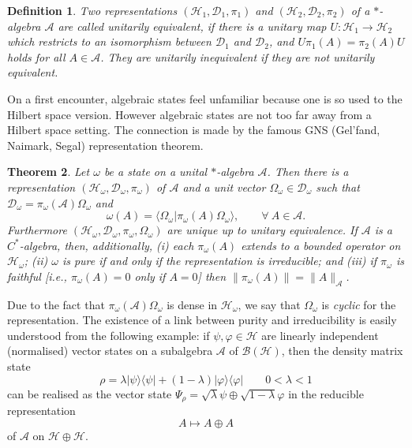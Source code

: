 \documentclass[12pt,a4paper]{article}
\newcommand{\1}{\mathds{1}}                         %
\newcommand{\BB}{{\mathcal{B}}}
\newcommand{\HH}{{\mathcal{H}}}
\newcommand{\DD}{{\mathscr{D}}}
\newcommand{\Ac}{{\mathcal{A}}}
\newcommand{\ip}[2]{\langle #1|#2\rangle}
\newcommand{\ket}[1]{|#1\rangle}
\newcommand{\bra}[1]{\langle #1|}
\newtheorem{theorem}{Theorem}%
\newtheorem{df}[theorem]{Definition}}
\begin{document}
\begin{df}
	Two representations $(\HH_1,\DD_1,\pi_1)$ and $(\HH_2,\DD_2,\pi_2)$ of a $*$-algebra $\Ac$ are called \emph{unitarily equivalent}, if
	there is a unitary map $U:\HH_1\rightarrow\HH_2$ which 
	restricts to an isomorphism between $\DD_1$ and $\DD_2$, and 
	$U\pi_1(A)=\pi_2(A) U$ holds for all $A\in\Ac$. They are \emph{unitarily inequivalent} if they are not unitarily equivalent.
\end{df} 

On a first encounter, algebraic states feel unfamiliar because one is so used to the Hilbert space version. However algebraic states are not too far away from a Hilbert space setting. The connection is made by the famous GNS (Gel'fand, Naimark, Segal) representation theorem. 
\begin{theorem}  Let $\omega$ be a state on a unital $*$-algebra $\Ac$. 
	Then there is a representation $(\HH_\omega,\DD_\omega,\pi_\omega)$
	of $\Ac$ and a unit
	vector $\Omega_\omega\in\DD_\omega$ such that $\DD_\omega=\pi_\omega(\Ac)\Omega_\omega$ and
	\begin{equation}\label{eq:GNSprop}
	\omega(A) =\ip{\Omega_\omega}{\pi_\omega(A)\Omega_\omega}, \qquad \forall~A\in \Ac.
	\end{equation}
	Furthermore $(\HH_\omega,\DD_\omega,\pi_\omega,\Omega_\omega)$ are unique up to unitary equivalence. If $\Ac$ is a $C^*$-algebra,
	then, additionally, (i) each $\pi_\omega(A)$ extends to a bounded operator on $\HH_\omega$; (ii)
	$\omega$ is pure if and only if the representation is irreducible; 
	and (iii) if $\pi_\omega$ is faithful [i.e., $\pi_\omega(A)=0$ only if $A=0$] then $\|\pi_\omega(A)\|=\|A\|_{\Ac}$.  
\end{theorem}
Due to the fact that $\pi_\omega(\Ac)\Omega_\omega$ is dense in $\HH_\omega$, we say that $\Omega_\omega$ is \emph{cyclic} for the representation.
The existence of a link between purity and irreducibility is easily understood from the following example: if $\psi,\varphi\in\HH$ are linearly independent (normalised) vector states on a subalgebra $\Ac$ of $\BB(\HH)$, then the density matrix state
\[
\rho = \lambda \ket{\psi}\bra{\psi} + (1-\lambda)\ket{\varphi}\bra{\varphi}\qquad
0<\lambda<1
\]
can be realised as the vector state $\Psi_\rho=\sqrt{\lambda}\psi\oplus \sqrt{1-\lambda}\varphi$ in the reducible representation
\[
A\mapsto A\oplus A
\]
of $\Ac$ on $\HH\oplus\HH$.

\end{document}
